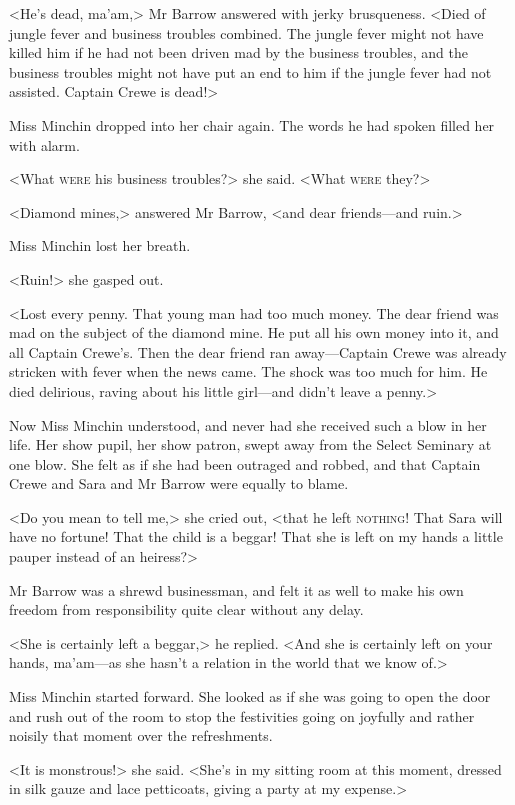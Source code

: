 <He's dead, ma'am,> Mr Barrow answered with jerky brusqueness. <Died of jungle fever and business troubles combined. The jungle fever might not have killed him if he had not been driven mad by the business troubles, and the business troubles might not have put an end to him if the jungle fever had not assisted. Captain Crewe is dead!>

Miss Minchin dropped into her chair again. The words he had spoken filled her with alarm.

<What \textsc{were} his business troubles?> she said. <What \textsc{were} they?>

<Diamond mines,> answered Mr Barrow, <and dear friends—and ruin.>

Miss Minchin lost her breath.

<Ruin!> she gasped out.

<Lost every penny. That young man had too much money. The dear friend was mad on the subject of the diamond mine. He put all his own money into it, and all Captain Crewe's. Then the dear friend ran away—Captain Crewe was already stricken with fever when the news came. The shock was too much for him. He died delirious, raving about his little girl—and didn't leave a penny.>

Now Miss Minchin understood, and never had she received such a blow in her life. Her show pupil, her show patron, swept away from the Select Seminary at one blow. She felt as if she had been outraged and robbed, and that Captain Crewe and Sara and Mr Barrow were equally to blame.

<Do you mean to tell me,> she cried out, <that he left \textsc{nothing}! That Sara will have no fortune! That the child is a beggar! That she is left on my hands a little pauper instead of an heiress?>

Mr Barrow was a shrewd businessman, and felt it as well to make his own freedom from responsibility quite clear without any delay.

<She is certainly left a beggar,> he replied. <And she is certainly left on your hands, ma'am—as she hasn't a relation in the world that we know of.>

Miss Minchin started forward. She looked as if she was going to open the door and rush out of the room to stop the festivities going on joyfully and rather noisily that moment over the refreshments.

<It is monstrous!> she said. <She's in my sitting room at this moment, dressed in silk gauze and lace petticoats, giving a party at my expense.>


